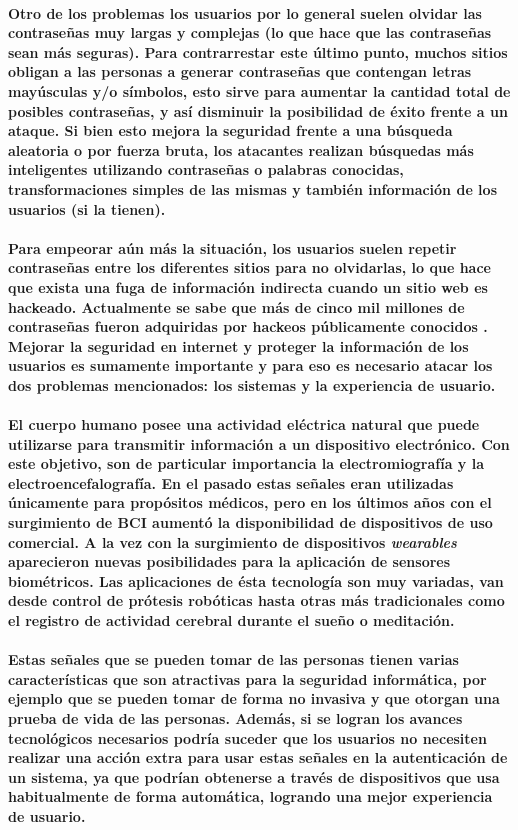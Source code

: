 \documentclass{article}
\begin{document}
\paragraph{
Otro de los problemas los usuarios por lo general suelen olvidar las contraseñas muy largas y complejas (lo que hace que las contraseñas sean más seguras). Para contrarrestar este último punto, muchos sitios obligan a las personas a generar contraseñas que contengan letras mayúsculas y/o símbolos, esto sirve para aumentar la cantidad total de posibles contraseñas, y así disminuir la posibilidad de éxito frente a un ataque. Si bien esto mejora la seguridad frente a una búsqueda aleatoria o por fuerza bruta, los atacantes realizan búsquedas más inteligentes utilizando contraseñas o palabras conocidas, transformaciones simples de las mismas y también información de los usuarios (si la tienen).
}
\paragraph{
Para empeorar aún más la situación, los usuarios suelen repetir contraseñas entre los diferentes sitios para no olvidarlas, lo que hace que exista una fuga de información indirecta cuando un sitio web es hackeado. Actualmente se sabe que más de cinco mil millones de contraseñas fueron adquiridas por hackeos públicamente conocidos \cite{haveibeenpwned}. Mejorar la seguridad en internet y proteger la información de los usuarios es sumamente importante y para eso es necesario atacar los dos problemas mencionados: los sistemas y la experiencia de usuario.
}
\paragraph{
El cuerpo humano posee una actividad eléctrica natural que puede utilizarse para transmitir información a un dispositivo electrónico. Con este objetivo, son de particular importancia la electromiografía y la electroencefalografía. En el pasado estas señales eran utilizadas únicamente para propósitos médicos, pero en los últimos años con el surgimiento de BCI aumentó la disponibilidad de dispositivos de uso comercial. A la vez con la surgimiento de dispositivos \textit{wearables} aparecieron nuevas posibilidades para la aplicación de sensores biométricos. Las aplicaciones de ésta tecnología son muy variadas, van desde control de prótesis robóticas hasta otras más tradicionales como el registro de actividad cerebral durante el sueño o meditación.
}
\paragraph{
Estas señales que se pueden tomar de las personas tienen varias características que son atractivas para la seguridad informática, por ejemplo que se pueden tomar de forma no invasiva y que otorgan una prueba de vida de las personas. Además, si se logran los avances tecnológicos necesarios podría suceder que los usuarios no necesiten realizar una acción extra para usar estas señales en la autenticación de un sistema, ya que podrían obtenerse a través de dispositivos que usa habitualmente de forma automática, logrando una mejor experiencia de usuario.
}
\end{document}
